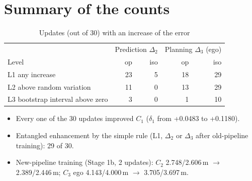 \documentclass[10pt,a4paper]{article}
\begin{document}
\section{Summary of the counts}
\begin{table}[h]\centering\small\caption{Updates (out of 30) with an increase of the error}
\begin{tabular}{lrrrr}\toprule
 & \multicolumn{2}{c}{Prediction $\Delta_2$} & \multicolumn{2}{c}{Planning $\Delta_3$ (ego)}\\
Level & op & iso & op & iso\\\midrule
L1 any increase & 23 & 5 & 18 & 29\\
L2 above random variation & 11 & 0 & 13 & 29\\
L3 bootstrap interval above zero & 3 & 0 & 1 & 10\\
\bottomrule\end{tabular}\end{table}
\begin{itemize}
\item Every one of the 30 updates improved $C_1$ ($\delta_1$ from +0.0483 to +0.1180).
\item Entangled enhancement by the simple rule (L1, $\Delta_2$ or $\Delta_3$ after old-pipeline training): 29 of 30.
\item New-pipeline training (Stage 1b, 2 updates): $C_2$ 2.748/2.606\,m $\rightarrow$ 2.389/2.446\,m; $C_3$ ego 4.143/4.000\,m $\rightarrow$ 3.705/3.697\,m.
\end{itemize}
\end{document}
